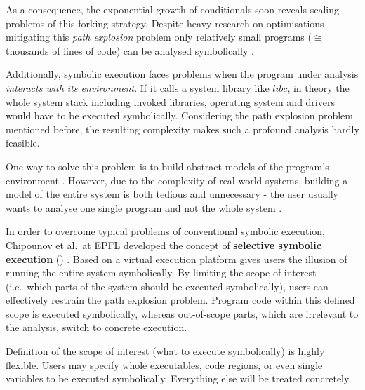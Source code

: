 As a consequence, the exponential growth of conditionals soon reveals scaling problems of this forking strategy.
Despite heavy research on optimisations mitigating this \textit{path explosion} problem
only relatively small programs ($\cong$ thousands of lines of code) can be analysed symbolically \cite{chip09sel}.

Additionally, symbolic execution faces problems when the program under analysis \textit{interacts with its environment}.
If it calls a system library like $libc$, in theory the whole system stack including invoked libraries, operating system and drivers would have to be executed symbolically.
Considering the path explosion problem mentioned before, the resulting complexity makes such a profound analysis hardly feasible.

One way to solve this problem is to build abstract models of the program's environment \cite{klee08, nasa08}.
However, due to the complexity of real-world systems, building a model of the entire system is both tedious and unnecessary - the user usually wants to analyse one single program and not the whole system \cite{chip09sel}.

\bigskip

In order to overcome typical problems of conventional symbolic execution, Chipounov et al.~at EPFL developed the concept of \textbf{selective symbolic execution} (\sse) \cite{chip09sel}.
Based on a virtual execution platform \sse gives users the illusion of running the entire system symbolically.
By limiting the scope of interest (i.e.~which parts of the system should be executed symbolically), users can effectively restrain the path explosion problem.
Program code within this defined scope is executed symbolically, whereas out-of-scope parts, which are irrelevant to the analysis, switch to concrete execution.


Definition of the scope of interest (what to execute symbolically) is highly flexible.
Users may specify whole executables, code regions, or even single variables to be executed symbolically. Everything else will be treated concretely.

